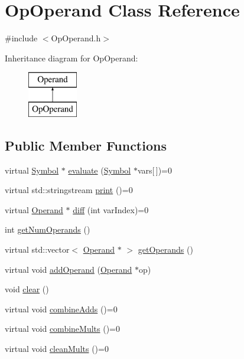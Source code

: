 \hypertarget{class_op_operand}{\section{Op\+Operand Class Reference}
\label{class_op_operand}
}


{\ttfamily \#include $<$Op\+Operand.\+h$>$}

Inheritance diagram for Op\+Operand\+:\begin{figure}[H]
\begin{center}
\leavevmode
\includegraphics[height=2.000000cm]{class_op_operand}
\end{center}
\end{figure}
\subsection*{Public Member Functions}
\begin{DoxyCompactItemize}
\item 
virtual \hyperlink{class_symbol}{Symbol} $\ast$ \hyperlink{class_op_operand_a5c1da397269f8edfb7ebb76c6da16bdb}{evaluate} (\hyperlink{class_symbol}{Symbol} $\ast$vars\mbox{[}$\,$\mbox{]})=0
\item 
virtual std\+::stringstream \hyperlink{class_op_operand_af23227873e50e47d7fa8fb72834d4823}{print} ()=0
\item 
virtual \hyperlink{class_operand}{Operand} $\ast$ \hyperlink{class_op_operand_ac20c0b3333ea6f67b677921f561c973b}{diff} (int var\+Index)=0
\item 
int \hyperlink{class_op_operand_ab73903f1d3eb535209eb15c992b17c61}{get\+Num\+Operands} ()
\item 
virtual std\+::vector$<$ \hyperlink{class_operand}{Operand} $\ast$ $>$ \hyperlink{class_op_operand_a4dabe730f5df82d74919c974fb54e1c6}{get\+Operands} ()
\item 
virtual void \hyperlink{class_op_operand_a97bd0af8d4e30f9815600b26bd0d2349}{add\+Operand} (\hyperlink{class_operand}{Operand} $\ast$op)
\item 
void \hyperlink{class_op_operand_a074990400d19506a0f82081b99ac5e19}{clear} ()
\item 
virtual void \hyperlink{class_op_operand_a7207c2534050ce2f909e29f4cc3b7345}{combine\+Adds} ()=0
\item 
virtual void \hyperlink{class_op_operand_a0e12f3662ac434767c8ad51053870fb2}{combine\+Mults} ()=0
\item 
virtual void \hyperlink{class_op_operand_a669d2794a1939e92e976c3ff41e72fc9}{clean\+Mults} ()=0
\end{DoxyCompactItemize}
